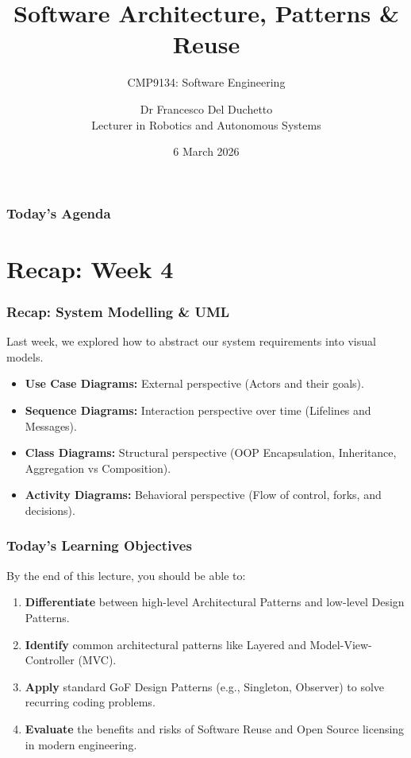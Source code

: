 \documentclass[xcolor=table]{beamer}
\title[CMP9134 - Week 5]{Software Architecture, Patterns \& Reuse}
\subtitle{CMP9134: Software Engineering}
\author[Francesco Del Duchetto]{Dr Francesco Del Duchetto\\Lecturer in Robotics and Autonomous Systems}
\institute[University of Lincoln]{University of Lincoln}
\date{6 March 2026}
\begin{document}
\begin{frame}
    \titlepage
\end{frame}

\begin{frame}
    \frametitle{Today's Agenda}
    \tableofcontents
\end{frame}

\section{Recap: Week 4}

\begin{frame}
    \frametitle{Recap: System Modelling \& UML}
    Last week, we explored how to abstract our system requirements into visual models.
    
    \begin{itemize}
        \item \textbf{Use Case Diagrams:} External perspective (Actors and their goals).
        \item \textbf{Sequence Diagrams:} Interaction perspective over time (Lifelines and Messages).
        \item \textbf{Class Diagrams:} Structural perspective (OOP Encapsulation, Inheritance, Aggregation vs Composition).
        \item \textbf{Activity Diagrams:} Behavioral perspective (Flow of control, forks, and decisions).
    \end{itemize}
\end{frame}

\begin{frame}
    \frametitle{Today's Learning Objectives}
    By the end of this lecture, you should be able to:
    \begin{enumerate}
        \item \textbf{Differentiate} between high-level Architectural Patterns and low-level Design Patterns.
        \item \textbf{Identify} common architectural patterns like Layered and Model-View-Controller (MVC).
        \item \textbf{Apply} standard GoF Design Patterns (e.g., Singleton, Observer) to solve recurring coding problems.
        \item \textbf{Evaluate} the benefits and risks of Software Reuse and Open Source licensing in modern engineering.
    \end{enumerate}
\end{frame}
\end{document}
